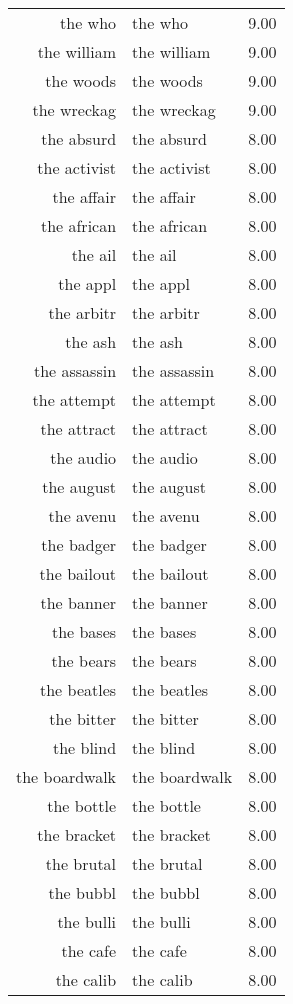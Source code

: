 \begin{table}[ht]
\begin{tabular}{rlr}
  the who & the who & 9.00 \\ 
  the william & the william & 9.00 \\ 
  the woods & the woods & 9.00 \\ 
  the wreckag & the wreckag & 9.00 \\ 
  the absurd & the absurd & 8.00 \\ 
  the activist & the activist & 8.00 \\ 
  the affair & the affair & 8.00 \\ 
  the african & the african & 8.00 \\ 
  the ail & the ail & 8.00 \\ 
  the appl & the appl & 8.00 \\ 
  the arbitr & the arbitr & 8.00 \\ 
  the ash & the ash & 8.00 \\ 
  the assassin & the assassin & 8.00 \\ 
  the attempt & the attempt & 8.00 \\ 
  the attract & the attract & 8.00 \\ 
  the audio & the audio & 8.00 \\ 
  the august & the august & 8.00 \\ 
  the avenu & the avenu & 8.00 \\ 
  the badger & the badger & 8.00 \\ 
  the bailout & the bailout & 8.00 \\ 
  the banner & the banner & 8.00 \\ 
  the bases & the bases & 8.00 \\ 
  the bears & the bears & 8.00 \\ 
  the beatles & the beatles & 8.00 \\ 
  the bitter & the bitter & 8.00 \\ 
  the blind & the blind & 8.00 \\ 
  the boardwalk & the boardwalk & 8.00 \\ 
  the bottle & the bottle & 8.00 \\ 
  the bracket & the bracket & 8.00 \\ 
  the brutal & the brutal & 8.00 \\ 
  the bubbl & the bubbl & 8.00 \\ 
  the bulli & the bulli & 8.00 \\ 
  the cafe & the cafe & 8.00 \\ 
  the calib & the calib & 8.00 \\ 

\end{tabular}
\end{table}

